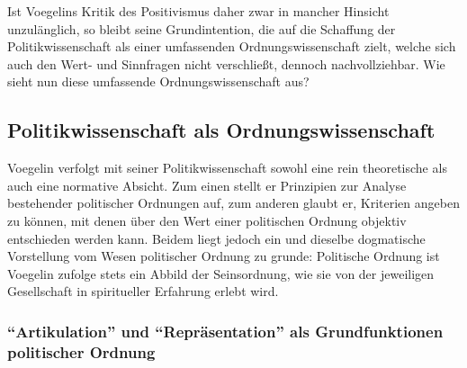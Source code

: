 Ist Voegelins Kritik des Positivismus daher zwar in mancher Hinsicht
unzulänglich, so bleibt seine Grundintention, die auf die Schaffung der
Politikwissenschaft als einer umfassenden Ordnungswissenschaft zielt, welche
sich auch den Wert- und Sinnfragen nicht verschließt, dennoch nachvollziehbar.
Wie sieht nun diese umfassende Ordnungswissenschaft aus?

\subsection{Politikwissenschaft als Ordnungswissenschaft}

Voegelin verfolgt mit seiner Politikwissenschaft sowohl eine rein
theoretische als auch eine normative Absicht. Zum einen stellt er Prinzipien
zur Analyse bestehender politischer Ordnungen auf, zum anderen glaubt er,
Kriterien angeben zu können, mit denen über den Wert einer politischen Ordnung
objektiv entschieden werden kann. Beidem liegt jedoch ein und dieselbe
dogmatische Vorstellung vom Wesen politischer Ordnung zu grunde: Politische
Ordnung ist Voegelin zufolge stets ein Abbild der Seinsordnung, wie sie von
der jeweiligen Gesellschaft in spiritueller Erfahrung erlebt wird.

\subsubsection{"`Artikulation"' und "`Repräsentation"' als Grundfunktionen
  politischer Ordnung}


